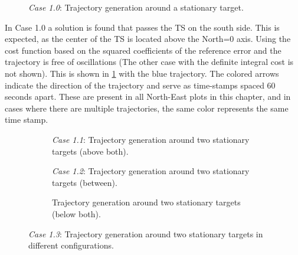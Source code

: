 \begin{figure}
    \centering
    
    \caption{\emph{Case 1.0}: Trajectory generation around a stationary target. }
    \label{fig:stationary-target}
\end{figure}

In Case 1.0 a solution is found that passes the TS on the south side. This is expected, as the center of the TS is located above the North=0 axis. Using the cost function based on the squared coefficients of the reference error and the trajectory is free of oscillations (The other case with the definite integral cost is not shown). This is shown in \cref{fig:stationary-target} with the blue trajectory. The colored arrows indicate the direction of the trajectory and serve as time-stamps  spaced 60 seconds apart. These are present in all North-East plots in this chapter, and in cases where there are multiple trajectories, the same color represents the same time stamp. 


\begin{figure}[hbtp]
    \centering
    \begin{subfigure}[b]{\textwidth}
        \centering
        
        \caption{\emph{Case 1.1}: Trajectory generation around two stationary targets (above both).}
        \label{fig:stationary-target-2}
    \end{subfigure}
    \hfill
    \begin{subfigure}[b]{\textwidth}
        \centering
        
        \caption{\emph{Case 1.2}: Trajectory generation around two stationary targets (between).}
        \label{fig:stationary-target-3}
    \end{subfigure}
    \hfill
    \begin{subfigure}[b]{\textwidth}
        \centering
        
        \caption{Trajectory generation around two stationary targets (below both).}
        \label{fig:stationary-target-4}
    \end{subfigure}
    \caption{\emph{Case 1.3}: Trajectory generation around two stationary targets in different configurations.}
    \label{fig:stationary-targets-subfigures}
\end{figure}

